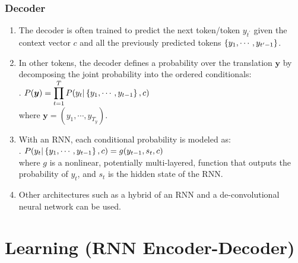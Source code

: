 \subsubsection*{Decoder}

\begin{enumerate}
    \item The decoder is often trained to predict the next token/token $y_{t^\prime}$ given the context vector $c$ and all the previously predicted tokens $\left\{y_1, \cdots , y_{t^\prime-1}\right\}$.
    \hfill \cite{arxiv/1409.0473/NMT-Jointly-Learning-Align-Translate}

    \item In other tokens, the decoder defines a probability over the translation $\bm{y}$ by decomposing the joint probability into the ordered conditionals:
    \hfill \cite{arxiv/1409.0473/NMT-Jointly-Learning-Align-Translate}
    \\[0.2cm]
    .\hfill
    $
        P(\bm{y}) = \displaystyle\prod_{t=1}^T P(y_t | \left\{y_1, \cdots , y_{t-1}\right\} , c)
    $
    \hfill \cite{arxiv/1409.0473/NMT-Jointly-Learning-Align-Translate}
    \\[0.2cm]
    where $\bm{y} = (y_1, \cdots , y_{T_y})$.
    \hfill \cite{arxiv/1409.0473/NMT-Jointly-Learning-Align-Translate}

    \item With an RNN, each conditional probability is modeled as:
    \hfill \cite{arxiv/1409.0473/NMT-Jointly-Learning-Align-Translate}
    \\[0.2cm]
    .\hfill
    $ P(y_t | \left\{y_1, \cdots , y_{t-1}\right\} , c) = g(y_{t-1}, s_t, c) $
    \hfill \cite{arxiv/1409.0473/NMT-Jointly-Learning-Align-Translate}
    \\[0.2cm]
    where $g$ is a nonlinear, potentially multi-layered, function that outputs the probability of $y_t$, and $s_t$ is the hidden state of the RNN.
    \hfill \cite{arxiv/1409.0473/NMT-Jointly-Learning-Align-Translate}

    \item Other architectures such as a hybrid of an RNN and a de-convolutional neural network can be used.
    \hfill \cite{arxiv/1409.0473/NMT-Jointly-Learning-Align-Translate}
\end{enumerate}









\section{Learning (RNN Encoder-Decoder)}

